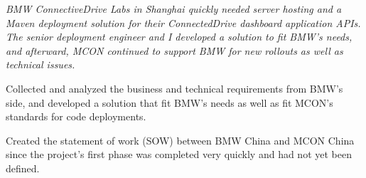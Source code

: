 \documentclass[a4paper]{deedy-resume-proximanova-sanfran} %
\begin{document}
\begin{minipage}[t]{0.66\textwidth}
\sectionspace %

\emph{BMW ConnectiveDrive Labs in Shanghai quickly needed server hosting and a Maven deployment solution for their ConnectedDrive dashboard application APIs. The senior deployment engineer and I developed a solution to fit BMW's needs, and afterward, MCON continued to support BMW for new rollouts as well as technical issues.}
\begin{tightitemize}
\item Collected and analyzed the business and technical requirements from BMW's side, and developed a solution that fit BMW's needs as well as fit MCON's standards for code deployments.
\item Created the statement of work (SOW) between BMW China and MCON China since the project's first phase was completed very quickly and had not yet been defined.
\end{tightitemize}









\end{minipage}
\end{document}
